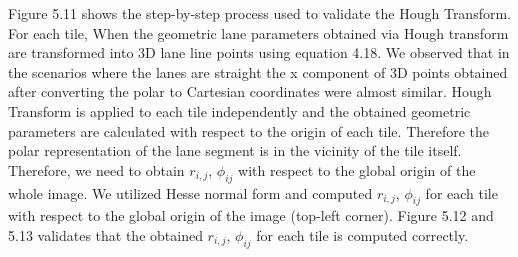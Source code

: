 Figure 5.11 shows the step-by-step process used to validate the Hough Transform. For each tile, When the geometric lane parameters obtained via Hough transform are transformed into 3D lane line points using equation 4.18. We observed that in the scenarios where the lanes are straight the x component of 3D points obtained after converting the polar to Cartesian coordinates were almost similar. Hough Transform is applied to each tile independently and the obtained geometric parameters are calculated with respect to the origin of each tile. Therefore the polar representation of the lane segment is in the vicinity of the tile itself. Therefore, we need to obtain $r_{i,j}$, $\phi_{ij}$ with respect to the global origin of the whole image. We utilized Hesse normal form and computed $r_{i,j}$, $\phi_{ij}$ for each tile with respect to the global origin of the image (top-left corner). Figure 5.12 and 5.13 validates that the obtained $r_{i,j}$, $\phi_{ij}$ for each tile is computed correctly. 


